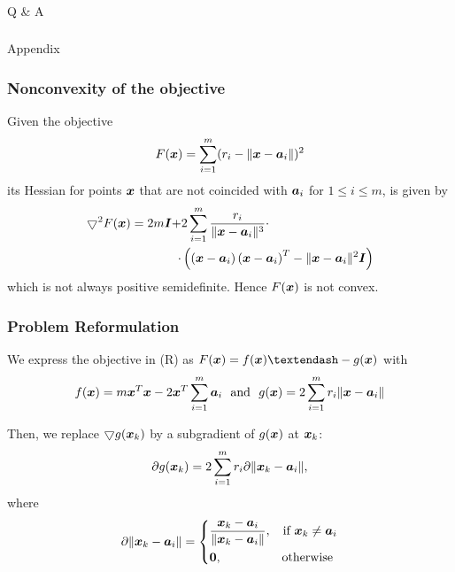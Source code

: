 \documentclass [t] {beamer} %
\begin{document}

\begin{frame} [noframenumbering]
\frametitle{  }
\phantom{m} 
\phantom{m}
\phantom{m} 
\phantom{m}
\phantom{m} 
\phantom{m}
\Huge{\centerline{Q \& A }}

\end{frame}

%
\appendix
\begin{frame} [noframenumbering]
\frametitle{  }
\phantom{m} 
\phantom{m}
\phantom{m} 
\phantom{m}
\phantom{m} 
\phantom{m}
\Huge{\centerline{Appendix}}
\end{frame}

\begin{frame}
\frametitle{Nonconvexity of the objective}
\phantom{m}
\linespread{0.1} \selectfont
Given the objective
\begin{equation}
 F(\mbox{\boldmath$x$})= \sum_{i=1}^{m} (r_i - \|{\mbox{\boldmath$x$}} - {\mbox{\boldmath$a$}}_i\|)^2 \nonumber
\end{equation}
\linespread{1}\selectfont
its Hessian for points $\mbox{\boldmath$x$}$ that are not coincided with $\mbox{\boldmath$a$}_i$ for $1 \leq i \leq m$, is given by
\begin{equation}
\begin{aligned}
\nonumber
\bigtriangledown ^2 F(\mbox{\boldmath$x$})  = 2m\mbox{\boldmath$I$}  + &2\sum^m_{i=1} \frac{r_i}{\|\mbox{\boldmath$x$} - \mbox{\boldmath$a$}_i\|^3} \cdot \\
\cdot &\left( \left(\mbox{\boldmath$x$} - \mbox{\boldmath$a$}_i\right)\left(\mbox{\boldmath$x$} - \mbox{\boldmath$a$}_i\right)^T - \|\mbox{\boldmath$x$} - \mbox{\boldmath$a$}_i\|^2 \mbox{\boldmath$I$} \right)
\end{aligned}
\end{equation}
which is not always positive semidefinite. Hence $F(\mbox{\boldmath$x$})$ is not convex.
\end{frame}

\begin{frame} 
\frametitle{Problem Reformulation}
We express the objective in (R) as $F(\Bx) = f(\Bx) –- g(\Bx)$ with 
 \begin{equation}  \nonumber 
f(\mbox{\boldmath$x$}) =  
m \mbox{\boldmath$x$}^T\mbox{\boldmath$x$} - 2 \mbox{\boldmath$x$}^T\sum^m_{i=1} \mbox{\boldmath$a$}_i \ \ \mbox{and } \ g(\mbox{\boldmath$x$}) = 2 \sum^m_{i = 1} r_i \|\mbox{\boldmath$x$} - \mbox{\boldmath$a$}_i\| 
\end{equation}
  
Then, we replace $\bigtriangledown g(\mbox{\boldmath$x$}_k)$ by a subgradient of $g(\mbox{\boldmath$x$})$ at $\mbox{\boldmath$x$}_k$:
\begin{equation} 
\nonumber
\partial g{(\mbox{\boldmath$x$}_k)}  = 2 \sum^m_{i = 1} r_i \partial \|\mbox{\boldmath$x$}_k - \mbox{\boldmath$a$}_i\|, 
\end{equation}
where 
\begin{equation}
\nonumber
\partial \|\mbox{\boldmath$x$}_k - \mbox{\boldmath$a$}_i\|  = \left\{
	\begin{aligned}
	& \frac{\mbox{\boldmath$x$}_k - \mbox{\boldmath$a$}_i}{\|\mbox{\boldmath$x$}_k - \mbox{\boldmath$a$}_i\|}, &\mbox{if } \mbox{\boldmath$x$}_k \neq \mbox{\boldmath$a$}_i \\
	& \mbox{\boldmath{$0$}}, &\mbox{otherwise }
	\end{aligned}
\right.
\end{equation}
\end{frame}
\end{document}
